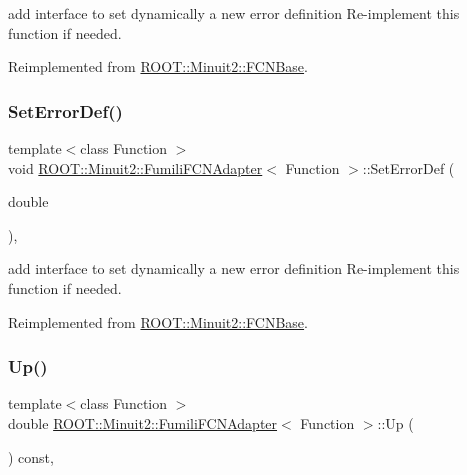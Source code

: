 add interface to set dynamically a new error definition Re-\/implement this function if needed. 

Reimplemented from \mbox{\hyperlink{classROOT_1_1Minuit2_1_1FCNBase_a840e02c2e6ef96eec289deca096b6088}{R\+O\+O\+T\+::\+Minuit2\+::\+F\+C\+N\+Base}}.

\mbox{\label{classROOT_1_1Minuit2_1_1FumiliFCNAdapter_a4c854e9ce5324ee557f818ecf5f00fb1}} 
\subsubsection{\texorpdfstring{SetErrorDef()}{SetErrorDef()}\hspace{0.1cm}{\footnotesize\ttfamily [3/3]}}
{\footnotesize\ttfamily template$<$class Function $>$ \\
void \mbox{\hyperlink{classROOT_1_1Minuit2_1_1FumiliFCNAdapter}{R\+O\+O\+T\+::\+Minuit2\+::\+Fumili\+F\+C\+N\+Adapter}}$<$ Function $>$\+::Set\+Error\+Def (\begin{DoxyParamCaption}\item[{double}]{ }\end{DoxyParamCaption})\hspace{0.3cm}{\ttfamily [inline]}, {\ttfamily [virtual]}}

add interface to set dynamically a new error definition Re-\/implement this function if needed. 

Reimplemented from \mbox{\hyperlink{classROOT_1_1Minuit2_1_1FCNBase_a840e02c2e6ef96eec289deca096b6088}{R\+O\+O\+T\+::\+Minuit2\+::\+F\+C\+N\+Base}}.

\mbox{\label{classROOT_1_1Minuit2_1_1FumiliFCNAdapter_aeed5b77f0bcca4854a9e6b0620ab3cb9}} 
\subsubsection{\texorpdfstring{Up()}{Up()}\hspace{0.1cm}{\footnotesize\ttfamily [1/3]}}
{\footnotesize\ttfamily template$<$class Function $>$ \\
double \mbox{\hyperlink{classROOT_1_1Minuit2_1_1FumiliFCNAdapter}{R\+O\+O\+T\+::\+Minuit2\+::\+Fumili\+F\+C\+N\+Adapter}}$<$ Function $>$\+::Up (\begin{DoxyParamCaption}{ }\end{DoxyParamCaption}) const\hspace{0.3cm}{\ttfamily [inline]}, {\ttfamily [virtual]}}

